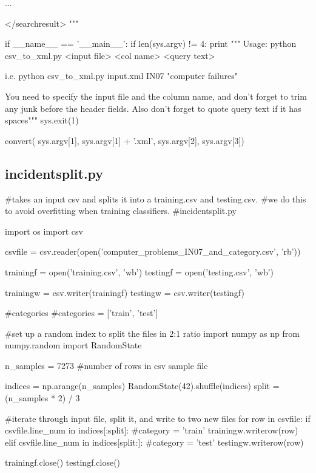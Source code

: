 \begin{pyverbatim}
  ...

</searchresult>
"""

if __name__ == '__main__':
    if len(sys.argv) != 4:
        print """
Usage:
    python csv_to_xml.py <input file> <col name> <query text>

  i.e.
    python csv_to_xml.py input.xml IN07 "computer failures"

  You need to specify the input file and the column name, and don't
  forget to trim any junk before the header fields. Also don't forget to
  quote query text if it has spaces"""
        sys.exit(1)

    convert( sys.argv[1], sys.argv[1] + '.xml', sys.argv[2], sys.argv[3])
\end{pyverbatim}

\subsection{incidentsplit.py}
\label{incidentsplit.py}
\begin{pyverbatim}
 
#takes an input csv and splits it into a training.csv and testing.csv. 
#we do this to avoid overfitting when training classifiers.
#incidentsplit.py

import os
import csv

csvfile = csv.reader(open('computer_problems_IN07_and_category.csv', 'rb'))

trainingf = open('training.csv', 'wb')
testingf = open('testing.csv', 'wb')

trainingw = csv.writer(trainingf)
testingw = csv.writer(testingf)

#categories
#categories = ['train', 'test']

#set up a random index to split the files in 2:1 ratio
import numpy as np
from numpy.random import RandomState

n_samples = 7273 #number of rows in csv sample file

indices = np.arange(n_samples)
RandomState(42).shuffle(indices)
split = (n_samples * 2) / 3

#iterate through input file, split it, and write to two new files
for row in csvfile:
        if csvfile.line_num in indices[:split]:
            #category = 'train'
            trainingw.writerow(row)
        elif csvfile.line_num in indices[split:]: 
            #category = 'test'
            testingw.writerow(row)

trainingf.close()
testingf.close()


\end{pyverbatim}

